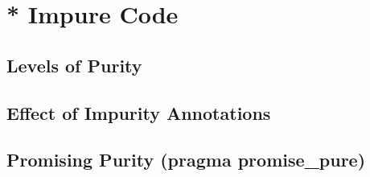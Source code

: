
\chapter{* Impure Code}
\section{Levels of Purity}
\section{Effect of Impurity Annotations}
\section{Promising Purity (pragma promise\_pure)}



